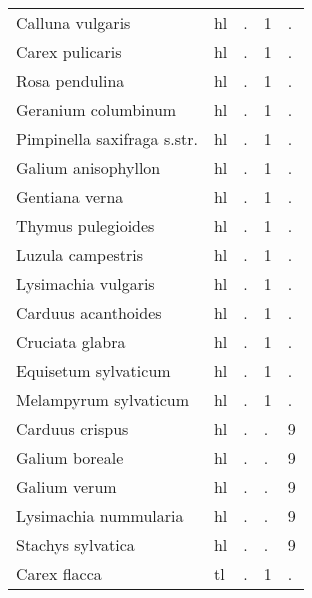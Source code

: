 \documentclass[9pt]{article}
\begin{document}
\begin{longtable}{p{70mm}p{10mm}p{5mm}p{5mm}p{5mm}}
Calluna vulgaris&hl&.&1&.\tabularnewline
Carex pulicaris&hl&.&1&.\tabularnewline
Rosa pendulina&hl&.&1&.\tabularnewline
Geranium columbinum&hl&.&1&.\tabularnewline
Pimpinella saxifraga s.str.&hl&.&1&.\tabularnewline
Galium anisophyllon&hl&.&1&.\tabularnewline
Gentiana verna&hl&.&1&.\tabularnewline
Thymus pulegioides&hl&.&1&.\tabularnewline
Luzula campestris&hl&.&1&.\tabularnewline
Lysimachia vulgaris&hl&.&1&.\tabularnewline
Carduus acanthoides&hl&.&1&.\tabularnewline
Cruciata glabra&hl&.&1&.\tabularnewline
Equisetum sylvaticum&hl&.&1&.\tabularnewline
Melampyrum sylvaticum&hl&.&1&.\tabularnewline
Carduus crispus&hl&.&.&9\tabularnewline
Galium boreale&hl&.&.&9\tabularnewline
Galium verum&hl&.&.&9\tabularnewline
Lysimachia nummularia&hl&.&.&9\tabularnewline
Stachys sylvatica&hl&.&.&9\tabularnewline
Carex flacca&tl&.&1&.\tabularnewline
\bottomrule
\end{longtable}
\end{document}
